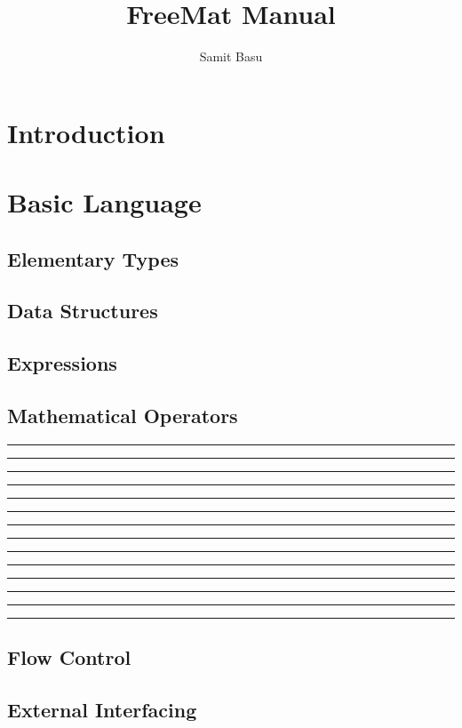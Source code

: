 \documentclass{book}
\title{FreeMat Manual}
\author{Samit Basu}
\begin{document}
\maketitle
\tableofcontents

\chapter{Introduction}

\chapter{Basic Language}

\section{Elementary Types}

\section{Data Structures}

\section{Expressions}

\section{Mathematical Operators}

\hrule

\hrule

\hrule

\hrule

\hrule

\hrule

\hrule

\hrule

\hrule

\hrule

\hrule

\hrule

\hrule

\hrule


\section{Flow Control}

\section{External Interfacing}

\end{document}
